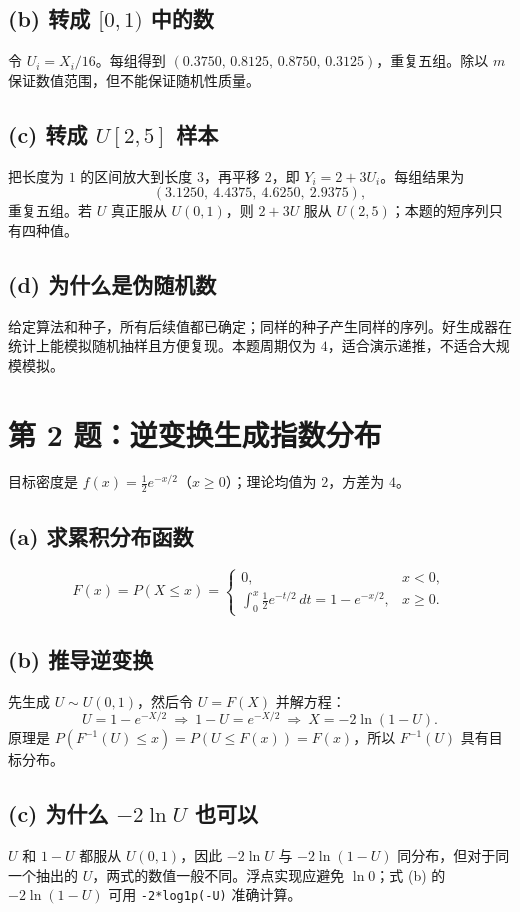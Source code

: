 \documentclass[UTF8,11pt,a4paper,fontset=none]{ctexart}
\begin{document}
\subsection*{(b) 转成 $[0,1)$ 中的数}
令 $U_i=X_i/16$。每组得到 $(0.3750,\,0.8125,\,0.8750,\,0.3125)$，重复五组。除以 $m$ 保证数值范围，但不能保证随机性质量。

\subsection*{(c) 转成 $U[2,5]$ 样本}
把长度为 $1$ 的区间放大到长度 $3$，再平移 $2$，即 $Y_i=2+3U_i$。每组结果为
\[
(3.1250,\ 4.4375,\ 4.6250,\ 2.9375),
\]
重复五组。若 $U$ 真正服从 $U(0,1)$，则 $2+3U$ 服从 $U(2,5)$；本题的短序列只有四种值。

\subsection*{(d) 为什么是伪随机数}
给定算法和种子，所有后续值都已确定；同样的种子产生同样的序列。好生成器在统计上能模拟随机抽样且方便复现。本题周期仅为 $4$，适合演示递推，不适合大规模模拟。

\section{第 2 题：逆变换生成指数分布}
目标密度是 $f(x)=\frac12e^{-x/2}$（$x\geq0$）；理论均值为 $2$，方差为 $4$。

\subsection*{(a) 求累积分布函数}
\[
F(x)=P(X\leq x)=
\begin{cases}
0,&x<0,\\
\displaystyle\int_0^x\frac12e^{-t/2}\,dt
=1-e^{-x/2},&x\geq0.
\end{cases}
\]

\subsection*{(b) 推导逆变换}
先生成 $U\sim U(0,1)$，然后令 $U=F(X)$ 并解方程：
\[
U=1-e^{-X/2}\ \Longrightarrow\
1-U=e^{-X/2}\ \Longrightarrow\
\boxed{X=-2\ln(1-U)}.
\]
原理是 $P(F^{-1}(U)\leq x)=P(U\leq F(x))=F(x)$，所以 $F^{-1}(U)$ 具有目标分布。

\subsection*{(c) 为什么 $-2\ln U$ 也可以}
$U$ 和 $1-U$ 都服从 $U(0,1)$，因此 $-2\ln U$ 与 $-2\ln(1-U)$ 同分布，但对于同一个抽出的 $U$，两式的数值一般不同。浮点实现应避免 $\ln0$；式 (b) 的 $-2\ln(1-U)$ 可用 \texttt{-2*log1p(-U)} 准确计算。
\end{document}
